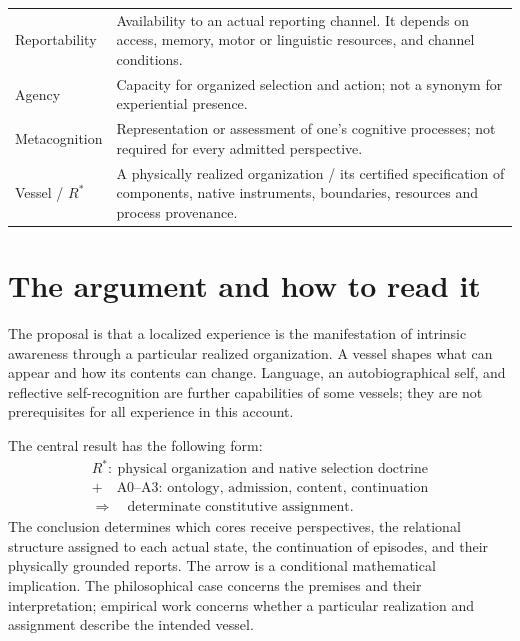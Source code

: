 \begin{longtable}{@{}>{\raggedright\arraybackslash}p{}>{\raggedright\arraybackslash}p{}@{}}
Reportability & Availability to an actual reporting channel. It depends on access, memory, motor or linguistic resources, and channel conditions.\\
Agency & Capacity for organized selection and action; not a synonym for experiential presence.\\
Metacognition & Representation or assessment of one's cognitive processes; not required for every admitted perspective.\\
Vessel / $R^\ast$ & A physically realized organization / its certified specification of components, native instruments, boundaries, resources and process provenance.\\\bottomrule
\end{longtable}

\chapter*{The argument and how to read it}\label{chapter:the-argument-and-how-to-read-it}
The proposal is that a localized experience is the manifestation of intrinsic awareness through a particular realized organization. A vessel shapes what can appear and how its contents can change. Language, an autobiographical self, and reflective self-recognition are further capabilities of some vessels; they are not prerequisites for all experience in this account.

The central result has the following form:
\[
\begin{gathered}
R^\ast:\ \text{physical organization and native selection doctrine}\\
+\quad\text{A0--A3: ontology, admission, content, continuation}\\[3pt]
\Longrightarrow\quad\text{determinate constitutive assignment}.
\end{gathered}
\]
The conclusion determines which cores receive perspectives, the relational structure assigned to each actual state, the continuation of episodes, and their physically grounded reports. The arrow is a conditional mathematical implication. The philosophical case concerns the premises and their interpretation; empirical work concerns whether a particular realization and assignment describe the intended vessel.

